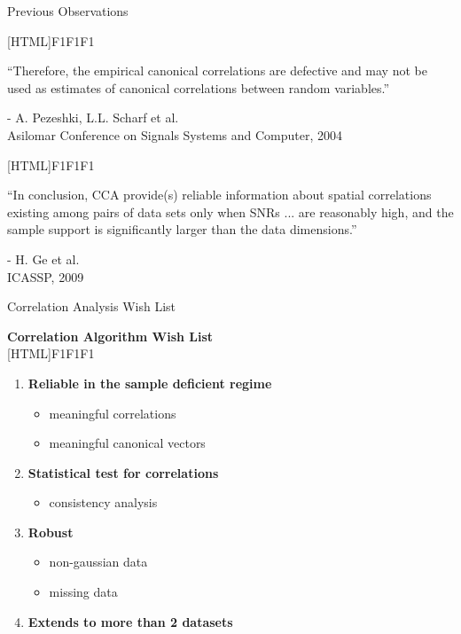 \documentclass[8pt]{beamer}
\begin{document}
\begin{frame}{Previous Observations}

\centering
{}[HTML]{F1F1F1}{\parbox{0.8\textwidth}{%
    ``Therefore, the \textcolor{textred}{empirical canonical correlations are defective and
      may not be used} as     estimates of canonical correlations between random
    variables.''
    \begin{flushright}- A. Pezeshki,     L.L. Scharf et al. \\Asilomar Conference on
      Signals Systems and Computer, 2004\end{flushright}

      }}

\vspace{4ex}

[HTML]{F1F1F1}{\parbox{0.8\textwidth}{%
    ``In conclusion, CCA provide(s) \textcolor{textred}{reliable information} about spatial
    correlations existing among pairs of data sets \textcolor{textred}{only when SNRs ... are
    reasonably high, and the sample support is significantly larger than the data
    dimensions.}''
  \begin{flushright} - H. Ge et al. \\ICASSP, 2009 \end{flushright}}}

\end{frame}

\begin{frame}{Correlation Analysis Wish List}

  \begin{center}
    \textbf{Correlation Algorithm Wish List}\\[1ex]
[HTML]{F1F1F1}{\parbox{0.8\textwidth}{%
    \begin{enumerate}
    \item \textbf{Reliable in the sample deficient regime}
      \begin{itemize}
      \item meaningful correlations
      \item meaningful canonical vectors
      \end{itemize}
    \item \textbf{Statistical test for correlations}
      \begin{itemize}
      \item consistency analysis
      \end{itemize}
    \item \textbf{Robust}
      \begin{itemize}
      \item non-gaussian data
      \item missing data
      \end{itemize}
    \item \textbf{Extends to more than 2 datasets}
    \end{enumerate}
}}
\end{center}

\end{frame}
\end{document}
